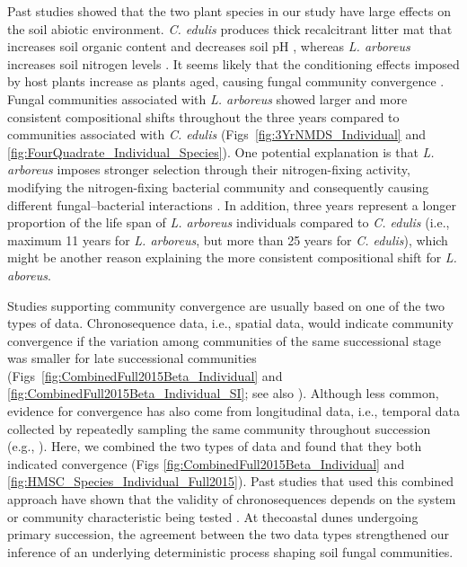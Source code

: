 Past studies showed that the two plant species in our study have large effects on the soil abiotic environment.
\textit{C. edulis} produces thick recalcitrant litter mat that increases soil organic content and decreases soil pH \citep{Novoa2013, Novoa2014}, whereas \textit{L. arboreus} increases soil nitrogen levels \citep{Maron1996, Maron2001}. 
It seems likely that the conditioning effects imposed by host plants increase as plants aged, causing fungal community convergence \citep{Dinnage2019}. 
Fungal communities associated with \textit{L. arboreus} showed larger and more consistent compositional shifts throughout the three years compared to communities associated with \textit{C. edulis} (Figs~\ref{fig:3YrNMDS_Individual} and \ref{fig:FourQuadrate_Individual_Species}). 
One potential explanation is that \textit{L. arboreus} imposes stronger selection through their nitrogen-fixing activity, modifying the nitrogen-fixing bacterial community and consequently causing different fungal--bacterial interactions \citep{Johansson2004}.
In addition, three years represent a longer proportion of the life span of \textit{L. arboreus} individuals compared to \textit{C. edulis} (i.e., maximum 11 years for \textit{L. arboreus}, but more than 25 years for \textit{C. edulis}), which might be another reason explaining the more consistent compositional shift for \textit{L. aboreus}. 
\par


Studies supporting community convergence are usually based on one of the two types of data. Chronosequence data, i.e., spatial data, would indicate community convergence if the variation among communities of the same successional stage was smaller for late successional communities (Figs~\ref{fig:CombinedFull2015Beta_Individual} and \ref{fig:CombinedFull2015Beta_Individual_SI}; see also \citealp{BrownJumpponen2014, Castle2016, RoyBolduc2016}).
Although less common, evidence for convergence has also come from longitudinal data, i.e., temporal data collected by repeatedly sampling the same community throughout succession (e.g., \citealp{Fukami2005, Li2016, Gao2019}).
Here, we combined the two types of data and found that they both indicated convergence (Figs \ref{fig:CombinedFull2015Beta_Individual} and \ref{fig:HMSC_Species_Individual_Full2015}). 
Past studies that used this combined approach have shown that the validity of chronosequences depends on the system or community characteristic being tested \citep{Foster2000, Clark2019}.
At thecoastal dunes undergoing primary succession, the agreement between the two data types strengthened our inference of an underlying deterministic process shaping soil fungal communities. 
\par


